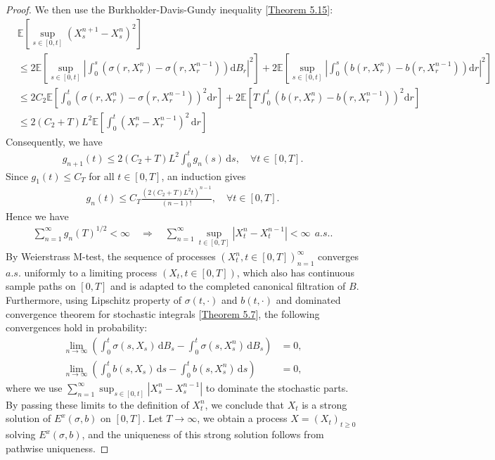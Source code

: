 \documentclass{article}
\numberwithin{equation}{section}
\newcommand{\E}{\mathbb{E}}
\renewcommand{\d}{\mathrm{d}}
\theoremstyle{plain}
\theoremstyle{definition}
\begin{document}
\begin{proof}
We then use the Burkholder-Davis-Gundy inequality [\hyperref[thm:5.15]{Theorem 5.15}]:
\begin{align*}
	&\E\left[\sup_{s\in[0,t]}(X_s^{n+1}-X_s^n)^2\right]\\
	&\leq 2\E\left[\sup_{s\in[0,t]}\left\vert\int_0^s\left(\sigma(r,X_r^n)-\sigma(r,X_r^{n-1})\right)\d B_r\right\vert^2\right] + 2\E\left[\sup_{s\in[0,t]}\left\vert\int_0^s\left(b(r,X_r^n)-b(r,X_r^{n-1})\right)\d r\right\vert^2\right]\\
	&\leq 2 C_2\E\left[\int_0^t\left(\sigma(r,X_r^n)-\sigma(r,X_r^{n-1})\right)^2\d r\right] + 2\E\left[T\int_0^t \left(b(r,X_r^n)-b(r,X_r^{n-1})\right)^2\d r\right]\\
	&\leq 2(C_2+T)L^2\E\left[\int_0^t(X_r^n-X_r^{n-1})^2\,\d r\right]
\end{align*}
Consequently, we have 
\begin{align*}
	g_{n+1}(t)\leq 2(C_2+T)L^2\int_0^t g_n(s)\,\d s,\quad\forall t\in[0,T].
\end{align*}
Since $g_1(t)\leq C_T$ for all $t\in[0,T]$, an induction gives
\begin{align*}
	g_n(t)\leq C_T\frac{(2(C_2+T)L^2t)^{n-1}}{(n-1)!},\quad \forall t\in[0,T].
\end{align*}
Hence we have
\begin{align*}
	\sum_{n=1}^\infty g_n(T)^{1/2}<\infty \quad\Rightarrow\quad \sum_{n=1}^\infty\sup_{t\in[0,T]}\left\vert X_t^n-X_t^{n-1}\right\vert <\infty\ \ a.s..
\end{align*}
By Weierstrass M-test, the sequence of processes $(X^n_t,t\in[0,T])_{n=1}^\infty$ converges $a.s.$ uniformly to a limiting process $(X_t,t\in[0,T])$, which also has continuous sample paths on $[0,T]$ and is adapted to the completed canonical filtration of $B$. Furthermore, using Lipschitz property of $\sigma(t,\cdot)$ and $b(t,\cdot)$ and dominated convergence theorem for stochastic integrals [\hyperref[thm:5.7]{Theorem 5.7}], the following convergences hold in probability:
\begin{align*}
	\lim_{n\to\infty}\left(\int_0^t\sigma(s,X_s)\,\d B_s-\int_0^t\sigma(s,X_s^n)\,\d B_s\right)&=0,\\
	\lim_{n\to\infty}\left(\int_0^t b(s,X_s)\,\d s-\int_0^t b(s,X_s^n)\,\d s\right)&=0,
\end{align*}
where we use $\sum_{n=1}^\infty\sup_{s\in[0,t]}\left\vert X_s^n-X_s^{n-1}\right\vert$ to dominate the stochastic parts. By passing these limits to the definition of $X_t^n$, we conclude that $X_t$ is a strong solution of $E^x(\sigma,b)$ on $[0,T]$. Let $T\to\infty$, we obtain a process $X=(X_t)_{t\geq 0}$ solving $E^x(\sigma,b)$, and the uniqueness of this strong solution follows from pathwise uniqueness.
\end{proof}
\end{document}
